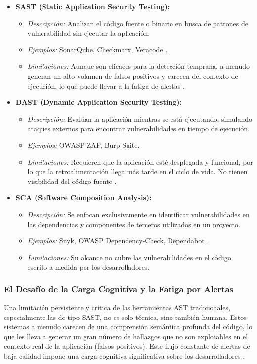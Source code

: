 \begin{itemize}
    \item \textbf{SAST (Static Application Security Testing):}
    \begin{itemize}
        \item \textit{Descripción:} Analizan el código fuente o binario en busca de patrones de vulnerabilidad sin ejecutar la aplicación.
        \item \textit{Ejemplos:} SonarQube, Checkmarx, Veracode \cite{SonarSourceDocSonarQube}.
        \item \textit{Limitaciones:} Aunque son eficaces para la detección temprana, a menudo generan un alto volumen de falsos positivos y carecen del contexto de ejecución, lo que puede llevar a la fatiga de alertas \cite{Johnson2023UsabilitySAST}.
    \end{itemize}
    
    \item \textbf{DAST (Dynamic Application Security Testing):}
    \begin{itemize}
        \item \textit{Descripción:} Evalúan la aplicación mientras se está ejecutando, simulando ataques externos para encontrar vulnerabilidades en tiempo de ejecución.
        \item \textit{Ejemplos:} OWASP ZAP, Burp Suite.
        \item \textit{Limitaciones:} Requieren que la aplicación esté desplegada y funcional, por lo que la retroalimentación llega más tarde en el ciclo de vida. No tienen visibilidad del código fuente \cite{Kumar2022DevSecOpsReview}.
    \end{itemize}
    
    \item \textbf{SCA (Software Composition Analysis):}
    \begin{itemize}
        \item \textit{Descripción:} Se enfocan exclusivamente en identificar vulnerabilidades en las dependencias y componentes de terceros utilizados en un proyecto.
        \item \textit{Ejemplos:} Snyk, OWASP Dependency-Check, Dependabot \cite{SnykDoc}.
        \item \textit{Limitaciones:} Su alcance no cubre las vulnerabilidades en el código escrito a medida por los desarrolladores.
    \end{itemize}
\end{itemize}

\subsubsection{El Desafío de la Carga Cognitiva y la Fatiga por Alertas}
Una limitación persistente y crítica de las herramientas AST tradicionales, especialmente las de tipo SAST, no es solo técnica, sino también humana. Estos sistemas a menudo carecen de una comprensión semántica profunda del código, lo que les lleva a generar un gran número de hallazgos que no son explotables en el contexto real de la aplicación (falsos positivos). Este flujo constante de alertas de baja calidad impone una carga cognitiva significativa sobre los desarrolladores \cite{Johnson2023UsabilitySAST}.

